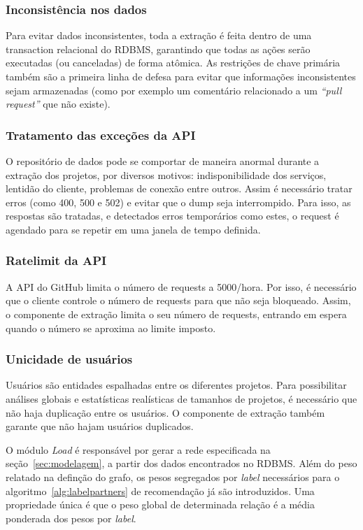 \documentclass[12pt,openany,oneside,a4paper,english,brazil]{abntbibufjf}
\begin{document}
    \subsubsection{Inconsistência nos dados} Para evitar dados inconsistentes, toda a extração é feita dentro de uma transaction relacional do RDBMS, garantindo que todas as ações serão executadas (ou canceladas) de forma atômica. As restrições de chave primária também são a primeira linha de defesa para evitar que informações inconsistentes sejam armazenadas (como por exemplo um comentário relacionado a um \textit{``pull request''} que não existe).

    \subsubsection{Tratamento das exceções da API} O repositório de dados pode se comportar de maneira anormal durante a extração dos projetos, por diversos motivos: indisponibilidade dos serviços, lentidão do cliente, problemas de conexão entre outros. Assim é necessário tratar erros (como 400, 500 e 502) e evitar que o dump seja interrompido. Para isso, as respostas são tratadas, e detectados erros temporários como estes, o request é agendado para se repetir em uma janela de tempo definida.

    \subsubsection{Ratelimit da API} A API do GitHub limita o número de requests a 5000/hora. Por isso, é necessário que o cliente controle o número de requests para que não seja bloqueado. Assim, o componente de extração limita o seu número de requests, entrando em espera quando o número se aproxima ao limite imposto.

    \subsubsection{Unicidade de usuários} Usuários são entidades espalhadas entre os diferentes projetos. Para possibilitar análises globais e estatísticas realísticas de tamanhos de projetos, é necessário que não haja duplicação entre os usuários. O componente de extração também garante que não hajam usuários duplicados.

    O módulo \textit{Load} é responsável por gerar a rede especificada na seção~\ref{sec:modelagem}, a partir dos dados encontrados no RDBMS. Além do peso relatado na definção do grafo, os pesos segregados por \textit{label} necessários para o algoritmo~\ref{alg:labelpartners} de recomendação já são introduzidos. Uma propriedade única é que o peso global de determinada relação é a média ponderada dos pesos por \textit{label}.
\end{document}
